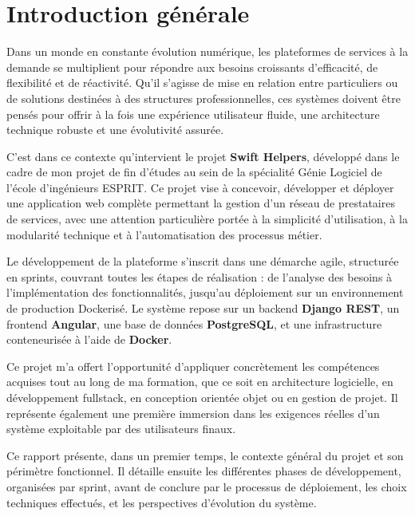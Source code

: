 \chapter*{\Large \center Introduction générale}

Dans un monde en constante évolution numérique, les plateformes de services à la demande se multiplient pour répondre aux besoins croissants d’efficacité, de flexibilité et de réactivité. Qu’il s’agisse de mise en relation entre particuliers ou de solutions destinées à des structures professionnelles, ces systèmes doivent être pensés pour offrir à la fois une expérience utilisateur fluide, une architecture technique robuste et une évolutivité assurée.

C’est dans ce contexte qu’intervient le projet \textbf{Swift Helpers}, développé dans le cadre de mon projet de fin d’études au sein de la spécialité Génie Logiciel de l’école d’ingénieurs ESPRIT. Ce projet vise à concevoir, développer et déployer une application web complète permettant la gestion d’un réseau de prestataires de services, avec une attention particulière portée à la simplicité d’utilisation, à la modularité technique et à l’automatisation des processus métier.

Le développement de la plateforme s’inscrit dans une démarche agile, structurée en sprints, couvrant toutes les étapes de réalisation : de l’analyse des besoins à l’implémentation des fonctionnalités, jusqu’au déploiement sur un environnement de production Dockerisé. Le système repose sur un backend \textbf{Django REST}, un frontend \textbf{Angular}, une base de données \textbf{PostgreSQL}, et une infrastructure conteneurisée à l’aide de \textbf{Docker}.

Ce projet m’a offert l’opportunité d’appliquer concrètement les compétences acquises tout au long de ma formation, que ce soit en architecture logicielle, en développement fullstack, en conception orientée objet ou en gestion de projet. Il représente également une première immersion dans les exigences réelles d’un système exploitable par des utilisateurs finaux.

Ce rapport présente, dans un premier temps, le contexte général du projet et son périmètre fonctionnel. Il détaille ensuite les différentes phases de développement, organisées par sprint, avant de conclure par le processus de déploiement, les choix techniques effectués, et les perspectives d’évolution du système.
